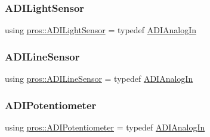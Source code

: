 \mbox{\label{namespacepros_a105b1224da9401cb8b6949713841fed7}} 
\subsubsection{\texorpdfstring{A\+D\+I\+Light\+Sensor}{ADILightSensor}}
{\footnotesize\ttfamily using \hyperlink{namespacepros_a105b1224da9401cb8b6949713841fed7}{pros\+::\+A\+D\+I\+Light\+Sensor} = typedef \hyperlink{classpros_1_1ADIAnalogIn}{A\+D\+I\+Analog\+In}}

\mbox{\label{namespacepros_a70a7be425ae5e39c353db03e14d62e9a}} 
\subsubsection{\texorpdfstring{A\+D\+I\+Line\+Sensor}{ADILineSensor}}
{\footnotesize\ttfamily using \hyperlink{namespacepros_a70a7be425ae5e39c353db03e14d62e9a}{pros\+::\+A\+D\+I\+Line\+Sensor} = typedef \hyperlink{classpros_1_1ADIAnalogIn}{A\+D\+I\+Analog\+In}}

\mbox{\label{namespacepros_a49b07257293eca610437130d01c47b89}} 
\subsubsection{\texorpdfstring{A\+D\+I\+Potentiometer}{ADIPotentiometer}}
{\footnotesize\ttfamily using \hyperlink{namespacepros_a49b07257293eca610437130d01c47b89}{pros\+::\+A\+D\+I\+Potentiometer} = typedef \hyperlink{classpros_1_1ADIAnalogIn}{A\+D\+I\+Analog\+In}}

